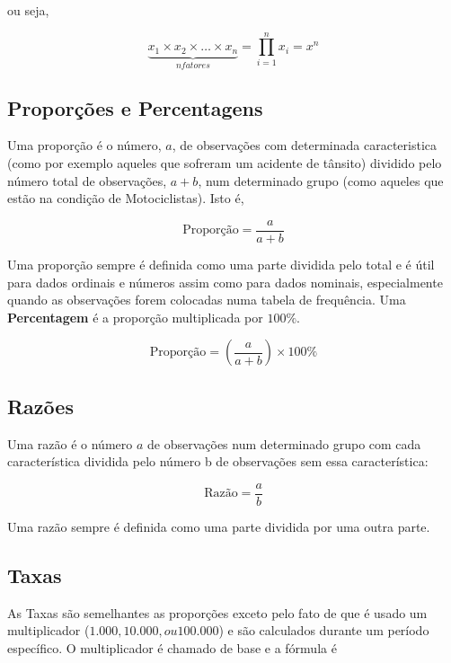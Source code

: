 ou seja,

\begin{equation}\label{}
    \underbrace{x_{1} \times x_{2} \times  \ldots \times x_{n}}_{n fatores}= \prod_{i=1}^{n}x_{i}= x^{n}
\end{equation}









\subsection{Proporções e Percentagens}


Uma proporção é o número, $a$, de observações com determinada caracteristica (como por exemplo aqueles que sofreram um acidente de tânsito) dividido pelo número total de observações, $a+b$, num determinado grupo (como aqueles que estão na condição de Motociclistas). Isto é,


$$ \mbox{Proporção} = \frac{a}{a+b}$$

Uma proporção sempre é definida como uma parte dividida pelo total e é útil para dados ordinais e números assim como para dados nominais, especialmente quando as observações forem colocadas numa tabela de frequência. Uma \textbf{Percentagem} é a proporção multiplicada por $100\%$.\vskip0.3cm


$$ \mbox{Proporção} = \left( \frac{a}{a+b} \right) \times 100\% $$


\subsection{Razões}

Uma razão é o número $a$ de observações num determinado grupo com cada característica
dividida pelo número b de observações sem essa característica:


$$ \mbox{Razão} = \frac{a}{b}$$

Uma razão sempre é definida como uma parte dividida por uma outra parte.\vskip0.3cm

\subsection{Taxas}

As Taxas são semelhantes as proporções exceto pelo fato de que é usado um multiplicador ($1.000 , 10.000 , ou 100.000$) e são calculados durante um período específico. O multiplicador é chamado de base e a fórmula é


